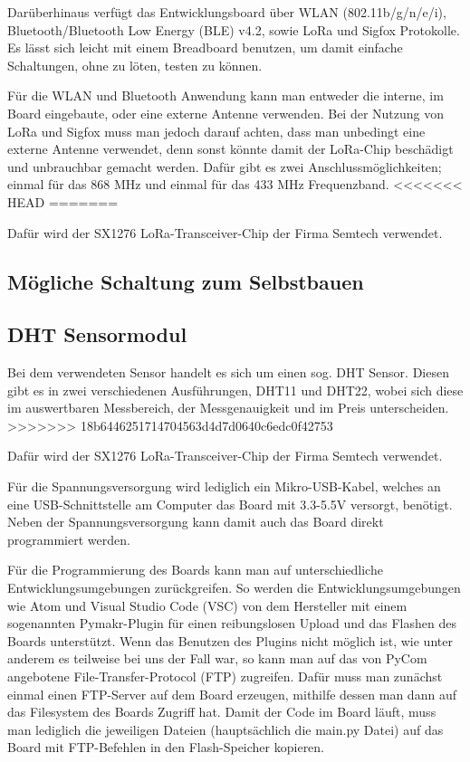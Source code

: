 Darüberhinaus verfügt das Entwicklungsboard über WLAN (802.11b/g/n/e/i), Bluetooth/Bluetooth Low Energy (BLE) v4.2, sowie LoRa und Sigfox Protokolle.  
Es lässt sich leicht mit einem Breadboard benutzen, um damit einfache Schaltungen, ohne zu löten, testen zu können. 

Für die WLAN und Bluetooth Anwendung kann man entweder die interne, im Board eingebaute, oder eine externe Antenne verwenden. Bei der Nutzung von LoRa und Sigfox muss man jedoch darauf achten, dass man unbedingt eine externe Antenne verwendet, denn sonst könnte damit der LoRa-Chip beschädigt und unbrauchbar gemacht werden. Dafür gibt es zwei Anschlussmöglichkeiten; einmal für das 868 MHz und einmal für das 433 MHz Frequenzband. 
<<<<<<< HEAD
=======

Dafür wird der SX1276 LoRa-Transceiver-Chip der Firma Semtech verwendet.

\subsection{Mögliche Schaltung zum Selbstbauen} \label{LoPy4}

\subsection{DHT Sensormodul} \label{DHT}

Bei dem verwendeten Sensor handelt es sich um einen sog. DHT Sensor. Diesen gibt es in zwei verschiedenen Ausführungen, DHT11 und DHT22, wobei sich diese im auswertbaren Messbereich, der Messgenauigkeit und im Preis unterscheiden.
>>>>>>> 18b6446251714704563d4d7d0640c6edc0f42753

Dafür wird der SX1276 LoRa-Transceiver-Chip der Firma Semtech verwendet. 

Für die Spannungsversorgung wird lediglich ein Mikro-USB-Kabel, welches an eine USB-Schnittstelle am Computer das Board mit 3.3-5.5V versorgt, benötigt. Neben der Spannungsversorgung kann damit auch das Board direkt programmiert werden. 

Für die Programmierung des Boards kann man auf unterschiedliche Entwicklungsumgebungen zurückgreifen. So werden die Entwicklungsumgebungen wie Atom und Visual Studio Code (VSC) von dem Hersteller mit einem sogenannten Pymakr-Plugin für einen reibungslosen Upload und das Flashen des Boards unterstützt. Wenn das Benutzen des Plugins nicht möglich ist, wie unter anderem es teilweise bei uns der Fall war, so kann man auf das von PyCom angebotene File-Transfer-Protocol (FTP) zugreifen. Dafür muss man zunächst einmal einen FTP-Server auf dem Board erzeugen, mithilfe dessen man dann auf das Filesystem des Boards Zugriff hat. Damit der Code im Board läuft, muss man lediglich die jeweiligen Dateien (hauptsächlich die main.py Datei) auf das Board mit FTP-Befehlen in den Flash-Speicher kopieren. 

